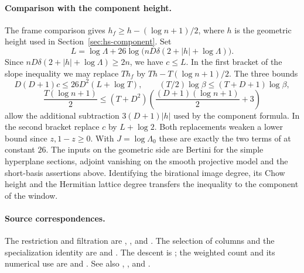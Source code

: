 \paragraph{Comparison with the component height.}
The frame comparison gives \(h_f\ge h-(\log n+1)/2\), where \(h\)
is the geometric height used in Section~\ref{sec:hs-component}. Set
\[
 L=\log\Lambda+26\log\!\bigl(nD\delta(2+|h|+\log\Lambda)\bigr).
\]
Since \(nD\delta(2+|h|+\log\Lambda)\ge2n\), we have \(c\le L\).
In the first bracket of the slope inequality we may replace
\(Th_f\) by \(Th-T(\log n+1)/2\).
The three bounds
\[
 D(D+1)c\le26D^2(L+\log T),\qquad
 (T/2)\log\beta\le(T+D+1)\log\beta,
\]
\[
 \frac{T(\log n+1)}2
 \le (T+D^2)\left(\frac{(D+1)(\log n+1)}2+3\right)
\]
allow the additional subtraction \(3(D+1)|h|\) used by the component
formula. In the second bracket replace \(c\) by \(L+\log2\).
Both replacements weaken a lower bound since \(z,1-z\ge0\).
With \(J=\log\Lambda_0\) these are exactly the two terms of
 at constant \(26\). The inputs on the geometric side are Bertini for the simple hyperplane
sections, adjoint vanishing on the smooth projective model and the
short-basis assertions above. Identifying the
birational image degree, its Chow height and the Hermitian lattice
degree transfers the inequality to the component of the window.

\paragraph{Source correspondences.}
The restriction and filtration are
,
,  and
.
The selection of columns and the specialization identity are
 and
. The descent is
; the weighted count and its numerical
use are  and
. See also ,
, and
.
